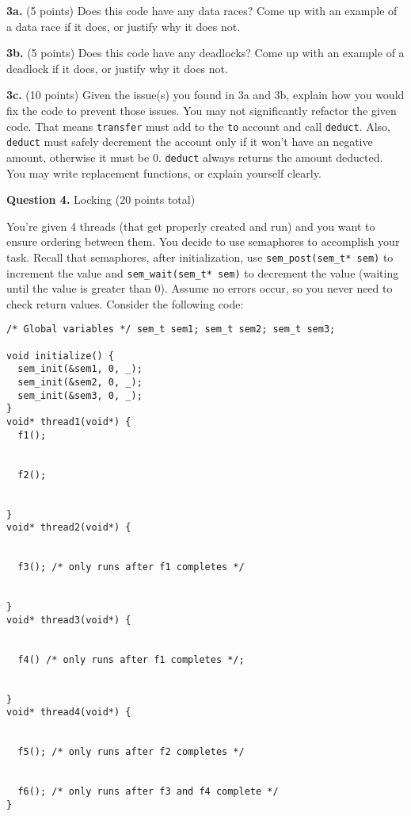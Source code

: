 \documentclass[12pt]{article}
\begin{document}
\vspace{1em}

\textbf{3a.} (5 points)
Does this code have any data races? Come up with an example of a data race if
it does, or justify why it does not.

\newpage

\textbf{3b.} (5 points)
Does this code have any deadlocks? Come up with an example of a deadlock if
it does, or justify why it does not.

\vspace{20em}

\textbf{3c.} (10 points)
Given the issue(s) you found in 3a and 3b, explain how you would fix the code
to prevent those issues.
You may not significantly refactor the given code.
That means \texttt{transfer} must add to the \texttt{to} account and call
\texttt{deduct}.
Also, \texttt{deduct} must safely decrement the account only if it won't have
an negative amount, otherwise it must be 0.
\texttt{deduct} always returns the amount deducted.
You may write replacement functions, or explain yourself clearly.

\newpage

\textbf{Question 4.} Locking (20 points total)

\vspace{1em}

You're given 4 threads (that get properly created and run) and you want to
ensure ordering between them.
You decide to use semaphores to accomplish your task.
Recall that semaphores, after initialization, use
\texttt{sem\_post(sem\_t* sem)} to increment the value and
\texttt{sem\_wait(sem\_t* sem)} to decrement the value (waiting until the value
is greater than 0).
Assume no errors occur, so you never need to check return values.
Consider the following code:

\begin{lstlisting}
/* Global variables */ sem_t sem1; sem_t sem2; sem_t sem3;

void initialize() {
  sem_init(&sem1, 0, _);
  sem_init(&sem2, 0, _);
  sem_init(&sem3, 0, _);
}
void* thread1(void*) {
  f1();


  f2();


}
void* thread2(void*) {


  f3(); /* only runs after f1 completes */


}
void* thread3(void*) {


  f4() /* only runs after f1 completes */;


}
void* thread4(void*) {


  f5(); /* only runs after f2 completes */


  f6(); /* only runs after f3 and f4 complete */
}
\end{lstlisting}
\end{document}
